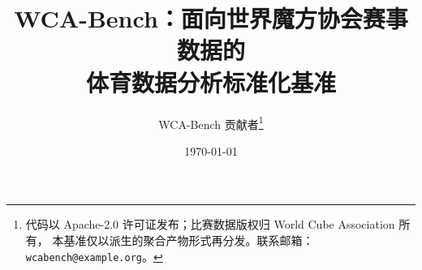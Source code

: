 \documentclass[11pt]{ctexart}
\title{\textbf{WCA-Bench：面向世界魔方协会赛事数据的\\体育数据分析标准化基准}}
\author{
  WCA-Bench 贡献者\thanks{%
    代码以 Apache-2.0 许可证发布；比赛数据版权归 World Cube Association 所有，
    本基准仅以派生的聚合产物形式再分发。联系邮箱：\texttt{wcabench@example.org}。}
}
\date{\today}
\begin{document}
\maketitle

\begin{abstract}

\end{abstract}















\appendix

\end{document}
